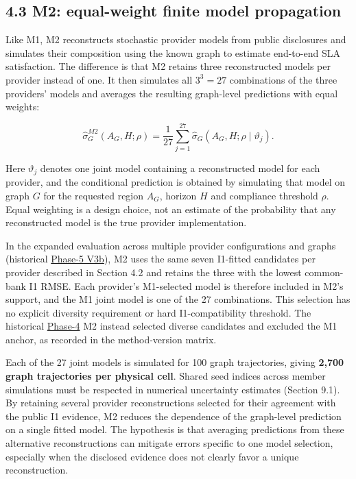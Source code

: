 \documentclass[10pt,a4paper]{article}
\begin{document}
\subsection*{4.3 M2: equal-weight finite model propagation}

Like M1, M2 reconstructs stochastic provider models from public disclosures and simulates their composition using the known graph to estimate end-to-end SLA satisfaction. The difference is that M2 retains three reconstructed models per provider instead of one. It then simulates all $3^3=27$ combinations of the three providers' models and averages the resulting graph-level predictions with equal weights:

\begin{equation*}
\widehat\sigma_G^{M2}(A_G,H;\rho)
=\frac{1}{27}\sum_{j=1}^{27}
\widehat\sigma_G(A_G,H;\rho\mid\vartheta_j).
\tag{10}
\end{equation*}

Here $\vartheta_j$ denotes one joint model containing a reconstructed model for each provider, and the conditional prediction is obtained by simulating that model on graph $G$ for the requested region $A_G$, horizon $H$ and compliance threshold $\rho$. Equal weighting is a design choice, not an estimate of the probability that any reconstructed model is the true provider implementation.

In the expanded evaluation across multiple provider configurations and graphs (historical \hyperref[app:experiment-stages]{Phase-5 V3b}), M2 uses the same seven I1-fitted candidates per provider described in Section 4.2 and retains the three with the lowest common-bank I1 RMSE. Each provider's M1-selected model is therefore included in M2's support, and the M1 joint model is one of the 27 combinations. This selection has no explicit diversity requirement or hard I1-compatibility threshold. The historical \hyperref[app:experiment-stages]{Phase-4} M2 instead selected diverse candidates and excluded the M1 anchor, as recorded in the method-version matrix.

Each of the 27 joint models is simulated for 100 graph trajectories, giving \textbf{2,700 graph trajectories per physical cell}. Shared seed indices across member simulations must be respected in numerical uncertainty estimates (Section 9.1). By retaining several provider reconstructions selected for their agreement with the public I1 evidence, M2 reduces the dependence of the graph-level prediction on a single fitted model. The hypothesis is that averaging predictions from these alternative reconstructions can mitigate errors specific to one model selection, especially when the disclosed evidence does not clearly favor a unique reconstruction.
\end{document}
